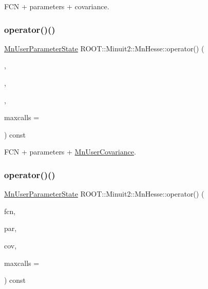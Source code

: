F\+CN + parameters + covariance. 

\mbox{\label{classROOT_1_1Minuit2_1_1MnHesse_a5d575c4f72e0024578b07579a7e3a4a3}} 
\subsubsection{\texorpdfstring{operator()()}{operator()()}\hspace{0.1cm}{\footnotesize\ttfamily [7/24]}}
{\footnotesize\ttfamily \mbox{\hyperlink{classROOT_1_1Minuit2_1_1MnUserParameterState}{Mn\+User\+Parameter\+State}} R\+O\+O\+T\+::\+Minuit2\+::\+Mn\+Hesse\+::operator() (\begin{DoxyParamCaption}\item[{const \mbox{\hyperlink{classROOT_1_1Minuit2_1_1FCNBase}{F\+C\+N\+Base}} \&}]{,  }\item[{const std\+::vector$<$ double $>$ \&}]{,  }\item[{const \mbox{\hyperlink{classROOT_1_1Minuit2_1_1MnUserCovariance}{Mn\+User\+Covariance}} \&}]{,  }\item[{unsigned int}]{maxcalls = {} }\end{DoxyParamCaption}) const}



F\+CN + parameters + \mbox{\hyperlink{classROOT_1_1Minuit2_1_1MnUserCovariance}{Mn\+User\+Covariance}}. 

\mbox{\label{classROOT_1_1Minuit2_1_1MnHesse_a5d575c4f72e0024578b07579a7e3a4a3}} 
\subsubsection{\texorpdfstring{operator()()}{operator()()}\hspace{0.1cm}{\footnotesize\ttfamily [8/24]}}
{\footnotesize\ttfamily \mbox{\hyperlink{classROOT_1_1Minuit2_1_1MnUserParameterState}{Mn\+User\+Parameter\+State}} R\+O\+O\+T\+::\+Minuit2\+::\+Mn\+Hesse\+::operator() (\begin{DoxyParamCaption}\item[{const \mbox{\hyperlink{classROOT_1_1Minuit2_1_1FCNBase}{F\+C\+N\+Base}} \&}]{fcn,  }\item[{const std\+::vector$<$ double $>$ \&}]{par,  }\item[{const \mbox{\hyperlink{classROOT_1_1Minuit2_1_1MnUserCovariance}{Mn\+User\+Covariance}} \&}]{cov,  }\item[{unsigned int}]{maxcalls = {} }\end{DoxyParamCaption}) const}



